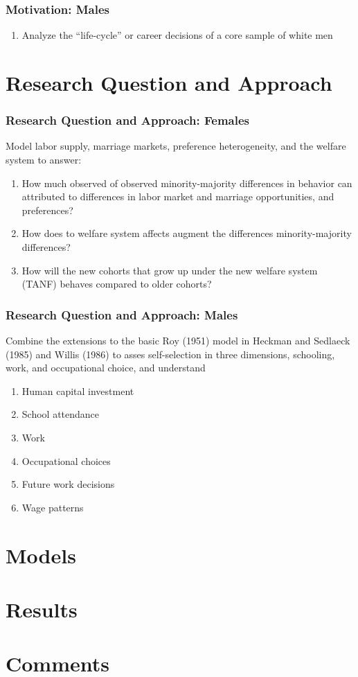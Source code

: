 \begin{frame}
	\frametitle{Motivation: Males}	
	\begin{enumerate}
		\item Analyze the ``life-cycle'' or career decisions of a core sample of white men
	\end{enumerate}
\end{frame}

\section{Research Question and Approach}
\begin{frame}
	\frametitle{Research Question and Approach: Females}
		\begin{wideitemize}
			\item Model labor supply, marriage markets, preference heterogeneity, and the welfare system to answer:
			\begin{enumerate}
			\item How much observed of observed minority-majority differences in behavior can attributed to differences in labor market and marriage opportunities, and preferences?
			\item How does to welfare system affects augment the differences minority-majority differences?
			\item How will the new cohorts that grow up under the new welfare system (TANF) behaves compared to older cohorts?
			\end{enumerate}
		\end{wideitemize}
		
\end{frame}

\begin{frame}
	\frametitle{Research Question and Approach: Males}
		\begin{wideitemize}
			\item Combine the extensions to the basic Roy (1951) model in Heckman and Sedlaeck (1985) and Willis (1986) to asses self-selection in three dimensions, schooling, work, and occupational choice, and understand
			\begin{enumerate}
				\item Human capital investment
				\item School attendance
				\item Work
				\item Occupational choices
				\item Future work decisions
				\item Wage patterns
			\end{enumerate}			 
		\end{wideitemize}
		
\end{frame}

\section{Models}


\section{Results}

\section{Comments}

